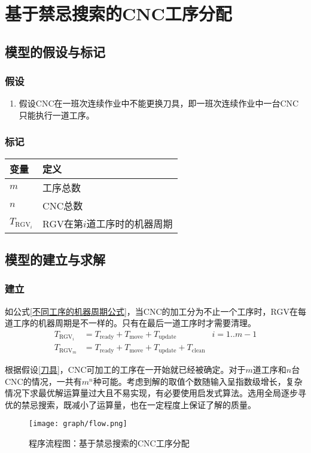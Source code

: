 \section{基于禁忌搜索的CNC工序分配}
	\subsection{模型的假设与标记}
		\subsubsection{假设}
			\begin{enumerate}
				\item\label{刀具}假设CNC在一班次连续作业中不能更换刀具，即一班次连续作业中一台CNC只能执行一道工序。
			\end{enumerate}
		\subsubsection{标记}
			\begin{table}[htbp]
				\centering
				\caption{标记：针对非抢占式排队系统的静态调度模型}
				\label{标记：针对非抢占式排队系统的静态调度模型}
					\begin{longtabu}to
						\toprule
						变量&定义\\\midrule
						\(m\)&工序总数\\
						\(n\)&CNC总数\\
						\(T_{\mathrm{RGV}_i}\)&RGV在第\(i\)道工序时的机器周期\\\bottomrule
					\end{longtabu}
			\end{table}
	\subsection{模型的建立与求解}
		\subsubsection{建立}
			如公式\ref{不同工序的机器周期公式}，当CNC的加工分为不止一个工序时，RGV在每道工序的机器周期是不一样的。只有在最后一道工序时才需要清理。
			\begin{align}
				\label{不同工序的机器周期公式}
				T_{\mathrm{RGV}_i}&=T_\mathrm{ready}+T_\mathrm{move}+T_\mathrm{update}&i=1..m-1\\
				T_{\mathrm{RGV}_m}&=T_\mathrm{ready}+T_\mathrm{move}+T_\mathrm{update}+T_\mathrm{clean}&
			\end{align}
			\par\indent 根据假设\ref{刀具}，CNC可加工的工序在一开始就已经被确定。对于\(m\)道工序和\(n\)台CNC的情况，一共有\(m^n\)种可能。考虑到解的取值个数随输入呈指数级增长，复杂情况下求最优解运算量过大且不易实现，有必要使用启发式算法\cite{陈华孙启元-392}。选用全局逐步寻优的禁忌搜索，既减小了运算量，也在一定程度上保证了解的质量。
			\begin{figure}[htbp]
				\centering
				\caption{程序流程图：基于禁忌搜索的CNC工序分配}
				\label{程序流程图：基于禁忌搜索的CNC工序分配}
				\texttt{[image: graph/flow.png]}
			\end{figure}
